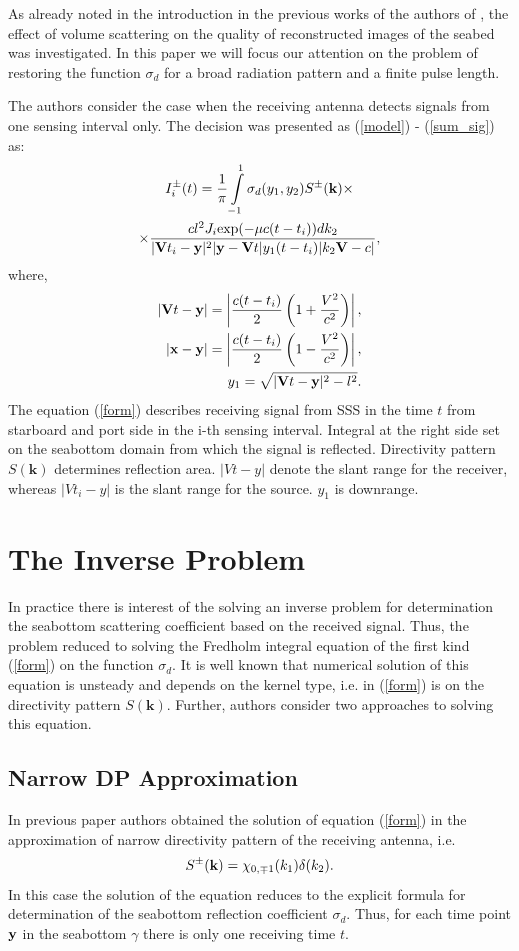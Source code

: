 \documentclass{procDDs}
\begin{document}
As already noted in the introduction in the previous works of the authors of \cite{AF2015, SPIE_KOV}, the effect of volume scattering on the quality of reconstructed images of the seabed was investigated. In this paper we will focus our attention on the problem of restoring the  function $\sigma_d$ for a broad radiation pattern and a finite pulse length.

The authors consider the case when the receiving antenna detects signals from one sensing interval only. The decision was presented as (\ref{model}) - (\ref{sum_sig}) as:
\begin{multline}
	\label{form}
	I^\pm_i(t) = \frac{1}{\pi}\int\limits_{-1}^{1}\sigma_d(y_1,y_2) S^{\pm}(\mathbf{k}) \times \\ \times
	\frac{ cl^2J_i \text{exp}(-\mu c(t-t_i))dk_2}{|\mathbf{V}t_i-\mathbf{y}|^2|\mathbf{y}-\mathbf{V}t|y_1(t-t_i)|k_2 \mathbf{V}-c|},
\end{multline}
where, 
\begin{align*}
	|\mathbf{V}t - \mathbf{y}| = \left|\dfrac{c(t-t_i)}{2}\left(1+\dfrac{V^2}{c^2}\right) \right|, \\
	|\mathbf{x}-\mathbf{y}| = \left|\dfrac{c(t-t_i)}{2}\left(1-\dfrac{V^2}{c^2}\right) \right|, \\
	y_1 = \sqrt{|\mathbf{V}t-\mathbf{y}|^2 - l^2}.
\end{align*}
The equation (\ref{form}) describes receiving signal from SSS in the time $t$ from starboard and port side in the i-th sensing interval. Integral at the right side set on the seabottom domain from which the signal is reflected. Directivity pattern $S(\textbf{k})$ determines reflection area. $|Vt-y|$ denote the slant range for the receiver, whereas $|Vt_i-y|$   is the slant range for the source. $y_1$ is downrange.

\section{The Inverse Problem}
In practice there is interest of the solving an inverse problem for determination the seabottom scattering coefficient based on the received signal. Thus, the problem reduced to solving the Fredholm integral equation of the first kind (\ref{form}) on the function $\sigma_d$. It is well known that numerical solution of this equation is unsteady and depends on the kernel type, i.e. in (\ref{form}) is on the directivity pattern $S(\textbf{k})$. Further, authors consider two approaches to solving this equation.
\subsection{Narrow DP Approximation}
In previous paper \cite{SPIE_KOV} authors obtained the solution of equation (\ref{form}) in the approximation of narrow directivity pattern of the receiving antenna, i.e. 
	\begin{equation}
	S^{\pm}(\mathbf{k}) = \chi_{0,\mp1}(k_1)\delta(k_2).
	\end{equation}
 In this case the solution of the equation reduces to the explicit formula for determination of the  seabottom reflection coefficient $\sigma_d$. Thus, for each time point $\mathbf{y}$ in the seabottom $\gamma$ there is only one receiving time $t$.
\end{document}
